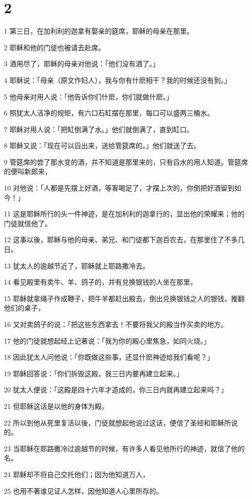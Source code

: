 \chapter{2}

\par 1 第三日，在加利利的迦拿有娶亲的筵席，耶稣的母亲在那里。
\par 2 耶稣和他的门徒也被请去赴席。
\par 3 酒用尽了，耶稣的母亲对他说：「他们没有酒了。」
\par 4 耶稣说：「母亲（原文作妇人），我与你有什麽相干？我的时候还没有到。」
\par 5 他母亲对用人说：「他告诉你们什麽，你们就做什麽。」
\par 6 照犹太人洁净的规矩，有六口石缸摆在那里，每口可以盛两三桶水。
\par 7 耶稣对用人说：「把缸倒满了水。」他们就倒满了，直到缸口。
\par 8 耶稣又说：「现在可以舀出来，送给管筵席的。」他们就送了去。
\par 9 管筵席的尝了那水变的酒，并不知道是那里来的，只有舀水的用人知道。管筵席的便叫新郎来，
\par 10 对他说：「人都是先摆上好酒，等客喝足了，才摆上次的，你倒把好酒留到如今！」
\par 11 这是耶稣所行的头一件神迹，是在加利利的迦拿行的，显出他的荣耀来；他的门徒就信他了。
\par 12 这事以後，耶稣与他的母亲、弟兄、和门徒都下迦百农去，在那里住了不多几日。
\par 13 犹太人的逾越节近了，耶稣就上耶路撒冷去。
\par 14 看见殿里有卖牛、羊、鸽子的，并有兑换银钱的人坐在那里，
\par 15 耶稣就拿绳子作成鞭子，把牛羊都赶出殿去，倒出兑换银钱之人的银钱，推翻他们的桌子，
\par 16 又对卖鸽子的说：「把这些东西拿去！不要将我父的殿当作买卖的地方。
\par 17 他的门徒就想起经上记著说：「我为你的殿心里焦急，如同火烧。」
\par 18 因此犹太人问他说：「你既做这些事，还显什麽神迹给我们看呢？」
\par 19 耶稣回答说：「你们拆毁这殿，我三日内要再建立起来。」
\par 20 犹太人便说：「这殿是四十六年才造成的，你三日内就再建立起来吗？」
\par 21 但耶稣这话是以他的身体为殿。
\par 22 所以到他从死里复活以後，门徒就想起他说过这话，便信了圣经和耶稣所说的。
\par 23 当耶稣在耶路撒冷过逾越节的时候，有许多人看见他所行的神迹，就信了他的名。
\par 24 耶稣却不将自己交托他们；因为他知道万人，
\par 25 也用不著谁见证人怎样，因他知道人心里所存的。

